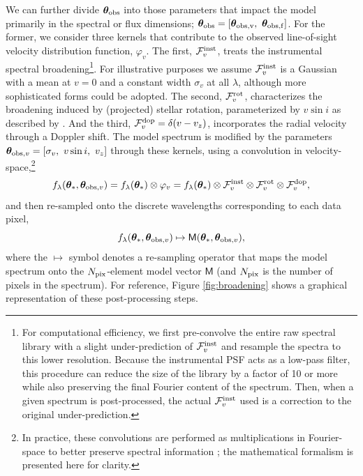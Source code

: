 \documentclass[iop,floatfix]{emulateapj}
\newcommand{\vM}{\mathsf{M}}
\newcommand{\flam}{f_\lambda}
\newcommand{\vt}{ {\bm \theta}}
\begin{document}
We can further divide $\vt_{\rm obs}$ into those parameters that impact the model primarily in the 
spectral or flux dimensions; $\vt_{\rm obs} = [\vt_{\rm obs, v}, \,\, \vt_{\rm obs, f}]$.  For the 
former, we consider three kernels that contribute to the observed line-of-sight velocity 
distribution function, $\varphi_v$.  The first, $\mathcal{F}_v^{\rm inst}$,
treats the instrumental spectral broadening\footnote{For computational
efficiency, we first pre-convolve the entire raw spectral library with a slight
under-prediction of $\mathcal{F}_v^{\rm inst}$ and resample the
spectra to this lower resolution. Because the instrumental PSF acts as a
low-pass filter, this procedure can reduce the size of the library by a factor
of 10 or more while also preserving the final Fourier content of the
spectrum. Then, when a given spectrum is post-processed, the actual $\mathcal{F}_v^{\rm
inst}$ used is a correction to the original
under-prediction.}.  For illustrative purposes we assume
$\mathcal{F}_v^{\rm inst}$ is a Gaussian 
with a mean at $v = 0$ and a constant width $\sigma_v$ at all $\lambda$, although more 
sophisticated forms could be adopted.  The second, $\mathcal{F}_v^{\rm rot}$, characterizes the 
broadening induced by (projected) stellar rotation, parameterized by $v\sin{i}$ as described by 
\citet[][his Eq.~18.14]{gray08}.  And the third, $\mathcal{F}_v^{\rm dop} = \delta(v-v_z)$, 
incorporates the radial velocity through a Doppler shift.  The model spectrum is modified by the 
parameters $\vt_{{\rm obs}, v} = [\sigma_v, \,\, v\sin{i}, \,\, v_z]$ through these kernels, using 
a convolution in velocity-space,\footnote{In practice, these convolutions are performed as 
multiplications in Fourier-space to better preserve spectral information \citep[cf.,][]{tonry79}; 
the mathematical formalism is presented here for clarity.}
\begin{equation}
\flam(\vt_{\ast}, \vt_{{\rm obs}, v}) = \flam(\vt_{\ast}) \otimes \varphi_v = \flam(\vt_{\ast}) \otimes \mathcal{F}_v^{\rm inst} \otimes \mathcal{F}_v^{\rm rot} \otimes \mathcal{F}_v^{\rm dop},
\label{eqn:broadening}
\end{equation}
and then re-sampled onto the discrete wavelengths corresponding to each data pixel, 
\begin{equation}
\flam(\vt_{\ast}, \vt_{{\rm obs}, v}) \mapsto \vM(\vt_{\ast}, \vt_{{\rm obs}, v}),
\label{eqn:resampling}
\end{equation}
where the $\mapsto$ symbol denotes a re-sampling operator that maps the model spectrum onto the 
$N_{\rm pix}$-element model vector $\vM$ (and $N_{\rm pix}$ is the number of pixels in the 
spectrum).  For reference, Figure \ref{fig:broadening} shows a graphical representation of these 
post-processing steps.
\end{document}
